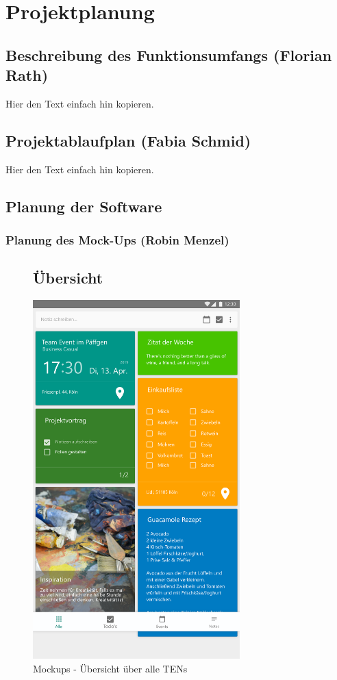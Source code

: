 \section{Projektplanung}
\label{instal}

\subsection{Beschreibung des Funktionsumfangs (Florian Rath)}

Hier den Text einfach hin kopieren.

\subsection{Projektablaufplan (Fabia Schmid)}

Hier den Text einfach hin kopieren.

\newpage
\subsection{Planung der Software}
\subsubsection{Planung des Mock-Ups (Robin Menzel)}
\begin{figure}[H]
	\subsection*{Übersicht}
	\centering
	\includegraphics[width=8cm]{img/OverviewActivity.pdf}
	\caption{Mockups - Übersicht über alle TENs}
	\label{img:OverviewActivity}
\end{figure}

